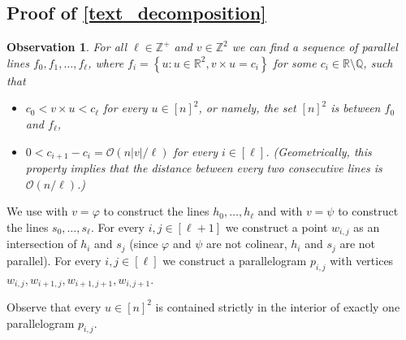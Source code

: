 \documentclass[11pt, letterpaper]{article}
\theoremstyle{plain}
\newtheorem{observation}{Observation}
\theoremstyle{definition}
\theoremstyle{remark}
\newcommand{\R}{\mathbb{R}}
\newcommand{\Z}{\mathbb{Z}}
\renewcommand{\O}{\mathcal{O}}
\renewcommand{\phi}{\varphi}
\newcommand{\set}[1]{\left\lbrace #1 \right\rbrace}
\begin{document}
\TextDecomposition

\subsection{Proof of \cref{text_decomposition}}

\newcommand{\IQ}{\mathbb{R} \setminus \mathbb{Q}}
\begin{observation}\label{line_existence}
	For all $\ell \in \Z^+$ and $v \in \Z^2$ we can find a sequence of parallel lines $f_0, f_1, \dots, f_\ell$, where $f_i = \set{u : u \in \R^2, v \times u = c_i}$ for some $c_i \in \IQ$, such that
	\begin{itemize}
		\item $c_0 < v \times u < c_\ell$ for every $u \in [n]^2$, or namely, the set $[n]^2$ is between $f_0$ and $f_\ell$,
		\item $0 < c_{i + 1} - c_i = \O(n|v| / \ell)$ for every $i \in [\ell]$. (Geometrically, this property implies that the distance between every two consecutive lines is $\O(n / \ell)$.)
	\end{itemize}
\end{observation}

We use  with $v = \phi$ to construct the lines $h_0, \dots, h_\ell$ and with $v = \psi$ to construct the lines $s_0, \dots, s_\ell$.
For every $i, j \in [\ell + 1]$ we construct a point $w_{i, j}$ as an intersection of $h_i$ and $s_j$ (since $\phi$ and $\psi$ are not colinear, $h_i$ and $s_j$ are not parallel).
For every $i, j \in [\ell]$ we construct a parallelogram $p_{i, j}$ with vertices $w_{i, j}, w_{i + 1, j}, w_{i + 1, j + 1}, w_{i, j + 1}$. 


Observe that every $u \in [n]^2$ is contained strictly in the interior of exactly one parallelogram $p_{i, j}$.
\end{document}
